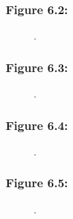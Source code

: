 \documentclass[t]{beamer}\usepackage[]{graphicx}\usepackage[]{color}
\begin{document}
\begin{frame}[label=Figure_6_2]
\frametitle{Figure 6.2: }
\begin{figure}[t]
\begin{minipage}[b]{\textwidth}
\centering

\caption{.}
\end{minipage}
\end{figure}
\end{frame}


\begin{frame}[label=Figure_6_3]
\frametitle{Figure 6.3: }
\begin{figure}[t]
\begin{minipage}[b]{\textwidth}
\centering

\caption{.}
\end{minipage}
\end{figure}
\end{frame}


\begin{frame}[label=Figure_6_4]
\frametitle{Figure 6.4: }
\begin{figure}[t]
\begin{minipage}[b]{\textwidth}
\centering

\caption{.}
\end{minipage}
\end{figure}
\end{frame}


\begin{frame}[label=Figure_6_5]
\frametitle{Figure 6.5: }
\begin{figure}[t]
\begin{minipage}[b]{\textwidth}
\centering

\caption{.}
\end{minipage}
\end{figure}
\end{frame}
\end{document}
